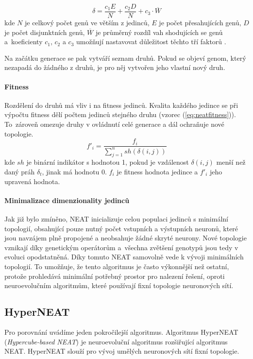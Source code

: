 \begin{equation}
    \delta = \frac{c_1E}{N} + \frac{c_2D}{N} + c_3\cdot\overline{W}
\end{equation}
kde $N$ je celkový počet genů ve větším z jedinců, $E$ je počet přesahujících
genů, $D$ je počet disjunktních genů, $\overline{W}$ je průměrný rozdíl vah
shodujících se genů a~koeficienty $c_1$, $c_2$ a $c_3$ umožňují nastavovat
důležitost těchto tří faktorů \citep{stanley2002evolving}.

Na začátku generace se pak vytváří seznam druhů. Pokud se objeví genom, který
nezapadá do žádného z druhů, je pro něj vytvořen jeho vlastní nový druh.

\paragraph{Fitness}
Rozdělení do druhů má vliv i na fitness jedinců. Kvalita každého jedince se při
výpočtu fitness dělí počtem jedinců stejného druhu (vzorec
(\ref{eq:neatfitness})). To~zároveň omezuje druhy v ovládnutí celé generace a
dál ochraňuje nové topologie.
\begin{equation} \label{eq:neatfitness}
    f'_i = \frac{f_i}{\sum_{j=1}^n sh(\delta(i,j))}
\end{equation}
kde $sh$ je binární indikátor s hodnotou 1, pokud je vzdálenost $\delta(i,j)$
menší než daný práh $\delta_t$, jinak má hodnotu 0. $f_i$ je fitness hodnota
jedince a $f'_i$ jeho upravená hodnota.

\paragraph{Minimalizace dimenzionality jedinců}
Jak již bylo zmíněno, NEAT inicializuje celou populaci jedinců s minimální
topologií, obsahující pouze nutný počet vstupních a výstupních neuronů,
které jsou navzájem plně propojené a neobsahuje žádné skryté neurony. Nové
topologie vznikají díky genetickým operátorům a~všechna zvětšení genotypů jsou
tedy v evoluci opodstatněná. Díky tomuto NEAT samovolně vede k vývoji
minimálních topologií. To umožňuje, že tento algoritmus je často výkonnější než
ostatní, protože prohledává minimální potřebný prostor pro nalezení řešení,
oproti neuroevolučním algoritmům, které používají fixní topologie neuronových
sítí.

\subsection{HyperNEAT} \label{NN - HyperNEAT}
Pro porovnání uvádíme jeden pokročilejší algoritmus. Algoritmus HyperNEAT
(\emph{Hypercube-based NEAT}) \citep{stanley2009hypercube} \citep{eplex} je
neuroevoluční algoritmus rozšiřující algoritmus NEAT. HyperNEAT slouží pro
vývoj umělých neuronových sítí fixní topologie. 

